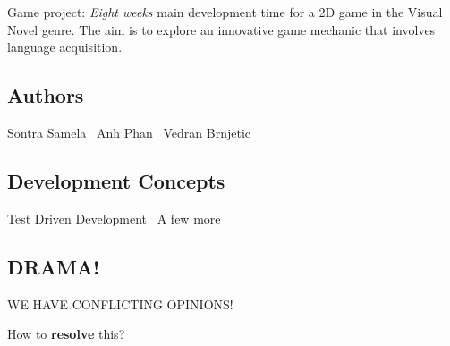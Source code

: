 Game project\+: {\itshape Eight weeks\textquotesingle{}} main development time for a 2D game in the Visual Novel genre. The aim is to explore an innovative game mechanic that involves language acquisition.

\subsection*{Authors~\newline
}

Sontra Samela~\newline
 Anh Phan~\newline
 Vedran Brnjetic~\newline


\subsection*{Development Concepts~\newline
}

Test Driven Development~\newline
 A few more~\newline


\subsection*{D\+R\+A\+M\+A!}

WE H\+A\+VE C\+O\+N\+F\+L\+I\+C\+T\+I\+NG O\+P\+I\+N\+I\+O\+N\+S!

How to {\bfseries resolve} this? 
